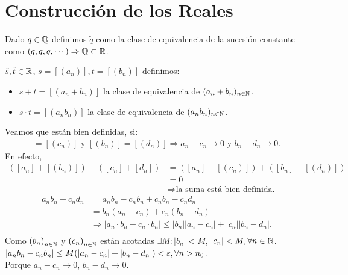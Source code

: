 \section{Construcción de los Reales}

\begin{note}
	Dado \(q \in \mathbb{Q} \) definimos \(\tilde{q} \) como la clase de equivalencia de la sucesión constante como \((q, q, q, \cdots) \Rightarrow \mathbb{Q} \subset \mathbb{R} \).
\end{note}

\begin{definition}
	\(\tilde{s}, \tilde{t} \in \mathbb{R} \), \(s = [(a_n)], t = [(b_n)]\) definimos:
	\begin{itemize}
		\item \(s+t = [(a_n + b_n)]\) la clase de equivalencia de \((a_n + b_n)_{n \in \mathbb{N}} \).
		\item \(s \cdot t = [(a_n b_n)]\) la clase de equivalencia de \((a_n b_n)_{n \in \mathbb{N}} \).
	\end{itemize}
	Veamos que están bien definidas, si: \begin{align*}
		[(a_n)] = [(c_n)] \text{ y } [(b_n)] = [(d_n)] \Rightarrow a_n - c_n \to 0 \text{ y } b_n - d_n \to 0.
	\end{align*}
	En efecto,
	\begin{align*}
		([a_n] + [(b_n)]) - ([c_n] +[d_n]) & = ([a_n] - [(c_n)]) + ([b_n] - [(d_n)])        \\
		                                   & = 0                                            \\
		                                   & \Rightarrow \text{la suma está bien definida.}
	\end{align*}
	\begin{align*}
		a_n b_n - c_n d_n & = a_n b_n - c_n b_n + c_n b_n - c_n d_n                                                 \\
		                  & = b_n (a_n - c_n) + c_n (b_n - d_n)                                                     \\
		                  & \Rightarrow |a_n \cdot b_n - c_n \cdot b_n| \leq |b_n| |a_n - c_n| + |c_n| |b_n - d_n|. \\
	\end{align*}
	Como \({(b_n)}_{n \in \mathbb{N}} \) y \({(c_n)}_{n \in \mathbb{N}} \) están acotadas \(\exists M : |b_n| < M\), \(|c_n| < M, \forall n \in \mathbb{N} \). \\
	\(|a_n b_n - c_n b_n| \leq M (|a_n - c_n| + |b_n - d_n|) < \varepsilon, \forall n > n_0\). \\
	Porque \(a_n - c_n \to 0\), \(b_n - d_n \to 0\).
\end{definition}

